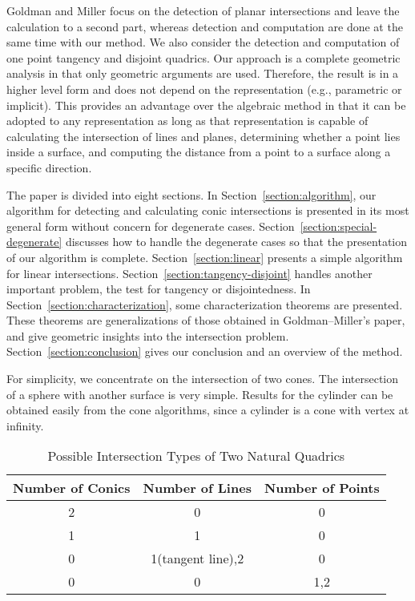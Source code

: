     Goldman and Miller focus on the detection of planar intersections and leave
the calculation to a second part, whereas detection and computation are done at
the same time with our method.   We also consider the detection and computation
of one point tangency and disjoint quadrics.  Our approach is a complete 
geometric analysis in that only geometric arguments are used.  Therefore, the 
result is in a higher level form and does not depend on the representation 
(e.g., parametric or implicit).  This provides an advantage over the algebraic
method in that it can be adopted to any representation as long as that 
representation is capable of calculating the intersection of lines and planes,
determining whether a point lies inside a surface, and computing the distance 
from a point to a surface along a specific direction.

     The paper is divided into eight sections.  
In Section~\ref{section:algorithm}, our algorithm for detecting and 
calculating conic intersections is presented in its most general form without 
concern for degenerate cases.  Section~\ref{section:special-degenerate} 
discusses how to handle the degenerate cases so that the presentation of our 
algorithm is complete.  Section~\ref{section:linear} presents a simple 
algorithm  for linear intersections.  Section~\ref{section:tangency-disjoint} 
handles another important problem, the test for tangency or disjointedness.  
In Section~\ref{section:characterization}, some characterization 
theorems are presented.  These theorems are generalizations of those obtained 
in Goldman--Miller's paper, and give geometric insights into the intersection 
problem.  Section~\ref{section:conclusion} gives our conclusion and an overview
of the method.

     For simplicity, we concentrate on the intersection of two cones.  The 
intersection of a sphere with another surface is very simple.  Results for the
cylinder can be obtained easily from the cone algorithms, since a cylinder is 
a cone with vertex at infinity.  
\begin{table}
\begin{center}
\caption{Possible Intersection Types of Two Natural Quadrics}
\label{tbl:intersection-type}
\vspace{3mm}
\begin{tabular}{||c|c|c||} \hline
Number of Conics & Number of Lines & Number of Points \\ \hline
  2 & 0 & 0 \\ \hline
  1 & 1 & 0 \\ \hline
  0 & 1(tangent line),2 & 0 \\ \hline
  0 & 0 & 1,2 \\ \hline
\end{tabular}
\end{center}
\end{table}

